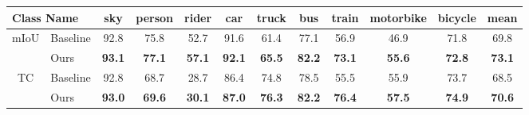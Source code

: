 \documentclass[runningheads]{llncs}
\begin{document}
\begin{table}[htb]
\begin{tabular}{l|l|c|c|c|c|c|c|c|c|c|c}
\multicolumn{2}{l|}{Class Name}                                           & sky                        & person                       & rider    & car    & truck  & bus   & train         & motorbike  & bicycle    & mean     \\\hline
\multicolumn{1}{c|}{\multirow{2}{*}{mIoU}}                                   & Baseline                     & 92.8                     & 75.8                       & 52.7   & 91.6 & 61.4 & 77.1 & 56.9        & 46.9       & 71.8     & 69.8  \\
                                          & Ours                         & \textbf{93.1}                     & \textbf{77.1}                       &\textbf{ 57.1}   & \textbf{92.1} & \textbf{65.5} &\textbf{ 82.2} & \textbf{73.1}        & \textbf{55.6}       & \textbf{72.8}     & \textbf{73.1}   \\\hline
\multicolumn{1}{c|}{\multirow{2}{*}{TC}}                      & Baseline                     & 92.8                     & 68.7                       & 28.7   & 86.4 & 74.8 & 78.5 & 55.5        & 55.9       & 73.7     & 68.5  \\
                                          & Ours                         & \textbf{93.0}                     &\textbf{ 69.6}                       & \textbf{30.1}   & \textbf{87.0} & \textbf{76.3} & \textbf{82.2} & \textbf{76.4 }      &\textbf{ 57.5}       & \textbf{74.9}     & \textbf{70.6}\\
                                          \bottomrule
\end{tabular}
\label{fig:classes}
\end{table}

\clearpage


\end{document}
